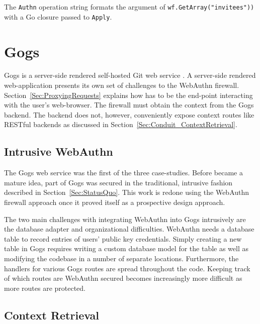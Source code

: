 The \lstinline{Authn} operation string formats the argument of \lstinline{wf.GetArray("invitees"))} with a Go closure passed to \lstinline{Apply}.

\section{Gogs}

Gogs is a server-side rendered self-hosted Git web service \cite{gogs}. A server-side rendered web-application presents its own set of challenges to the WebAuthn firewall. Section~\ref{Sec:ProxyingRequests} explains how \sys{} has to be the end-point interacting with the user's web-browser. The firewall must obtain the context from the Gogs backend. The backend does not, however, conveniently expose context routes like RESTful backends as discussed in Section~\ref{Sec:Conduit_ContextRetrieval}.


\subsection{Intrusive WebAuthn}

The Gogs web service was the first of the three case-studies. Before \sys{} became a mature idea, part of Gogs was secured in the traditional, intrusive fashion described in Section~\ref{Sec:StatusQuo}. This work is redone using the WebAuthn firewall approach once it proved itself as a prospective design approach.

The two main challenges with integrating WebAuthn into Gogs intrusively are the database adapter and organizational difficulties. WebAuthn needs a database table to record entries of users' public key credentials. Simply creating a new table in Gogs requires writing a custom database model for the table as well as modifying the codebase in a number of separate locations. Furthermore, the handlers for various Gogs routes are spread throughout the code. Keeping track of which routes are WebAuthn secured becomes increasingly more difficult as more routes are protected.


\subsection{Context Retrieval}

